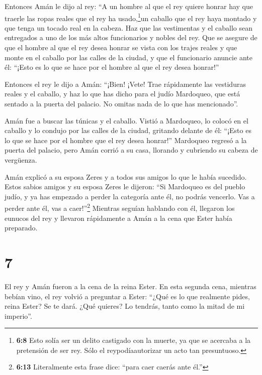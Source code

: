  Entonces Amán le dijo al rey: ``A un hombre al que el rey
quiere honrar  hay que traerle las ropas reales que el rey
ha usado,\footnote{\textbf{6:8} Esto solía ser un delito castigado con
  la muerte, ya que se acercaba a la pretensión de ser rey. Sólo el
  reypodíaautorizar un acto tan presuntuoso.}un caballo que el rey haya
montado y que tenga un tocado real en la cabeza.  Haz que
las vestimentas y el caballo sean entregados a uno de los más altos
funcionarios y nobles del rey. Que se asegure de que el hombre al que el
rey desea honrar se vista con los trajes reales y que monte en el
caballo por las calles de la ciudad, y que el funcionario anuncie ante
él: ``¡Esto es lo que se hace por el hombre al que el rey desea
honrar!''

 Entonces el rey le dijo a Amán: ``¡Bien! ¡Vete! Trae
rápidamente las vestiduras reales y el caballo, y haz lo que has dicho
para el judío Mardoqueo, que está sentado a la puerta del palacio. No
omitas nada de lo que has mencionado''.

 Amán fue a buscar las túnicas y el caballo. Vistió a
Mardoqueo, lo colocó en el caballo y lo condujo por las calles de la
ciudad, gritando delante de él: ``¡Esto es lo que se hace por el hombre
que el rey desea honrar!''  Mardoqueo regresó a la puerta
del palacio, pero Amán corrió a su casa, llorando y cubriendo su cabeza
de vergüenza.

 Amán explicó a su esposa Zeres y a todos sus amigos lo que
le había sucedido. Estos sabios amigos y su esposa Zeres le dijeron:
``Si Mardoqueo es del pueblo judío, y ya has empezado a perder la
categoría ante él, no podrás vencerlo. Vas a perder ante él, vas a
caer!''\footnote{\textbf{6:13} Literalmente esta frase dice: ``para caer
  caerás ante él.''}  Mientras seguían hablando con él,
llegaron los eunucos del rey y llevaron rápidamente a Amán a la cena que
Ester había preparado.

\hypertarget{section-6}{%
\section{7}\label{section-6}}

 El rey y Amán fueron a la cena de la reina Ester.
 En esta segunda cena, mientras bebían vino, el rey volvió a
preguntar a Ester: ``¿Qué es lo que realmente pides, reina Ester? Se te
dará. ¿Qué quieres? Lo tendrás, tanto como la mitad de mi imperio''.

